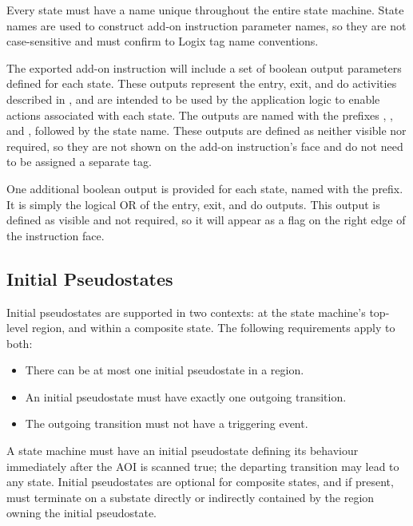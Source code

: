 Every state must have a name unique throughout the entire state
machine. State names are used to construct add-on instruction parameter names,
so they are not case-sensitive and must confirm to Logix tag name
conventions.

The exported add-on instruction will include a set of boolean output parameters
defined for each state. These outputs represent the entry, exit, and do
activities described in \textcite[\S14.2.3.4.3]{OMGUML}, and are intended to
be used by the application logic to enable actions associated with each
state. The outputs are named with the prefixes
, , and
, followed by the state name. These outputs are defined
as neither visible nor required, so they are not shown on the add-on
instruction's face and do not need to be assigned a separate tag.

One additional boolean output is provided for each state, named with the
 prefix. It is simply the logical OR of the
entry, exit, and do outputs. This output is defined as visible and not
required, so it will appear as a flag on the right edge of the
instruction face.


\subsection{Initial Pseudostates}

Initial pseudostates are supported in two contexts: at the state machine's
top-level region, and within a composite state. The following requirements
apply to both:

\begin{itemize}
  \item There can be at most one initial pseudostate in a region.

  \item An initial pseudostate must have exactly one outgoing transition.

  \item The outgoing transition must not have a triggering event.
\end{itemize}

A state machine must have an initial pseudostate defining its behaviour
immediately after the AOI is scanned true; the departing transition may lead
to any state. Initial pseudostates are optional for composite states,
and if present, must terminate on a substate directly or indirectly contained
by the region owning the initial pseudostate.

